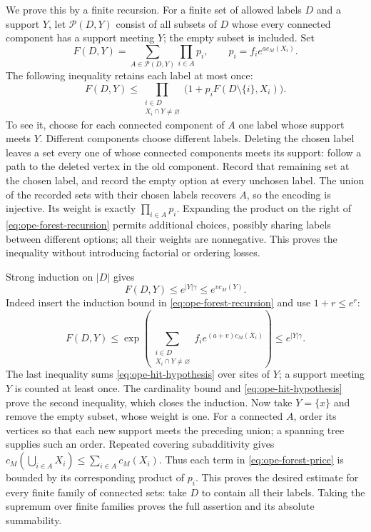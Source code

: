 We prove this by a finite recursion. For a finite set of allowed labels
$D$ and a support $Y$, let $\mathcal P(D,Y)$ consist of all subsets
of $D$ whose every connected component has a support meeting $Y$;
the empty subset is included. Set
\[
 F(D,Y)=\sum_{A\in\mathcal P(D,Y)}\prod_{i\in A}p_i,
 \qquad p_i=f_i e^{a c_M(X_i)}.
\]
The following inequality retains each label at most once:
\begin{equation}\label{eq:ope-forest-recursion}
 F(D,Y)\leq\prod_{\substack{i\in D\\X_i\cap Y\ne\varnothing}}
       \bigl(1+p_iF(D\setminus\{i\},X_i)\bigr).
\end{equation}
To see it, choose for each connected component of $A$ one label whose
support meets $Y$. Different components choose different labels.
Deleting the chosen label leaves a set every one of whose connected
components meets its support: follow a path to the deleted vertex
in the old component. Record that remaining set at the chosen label,
and record the empty option at every unchosen label. The union of the
recorded sets with their chosen labels recovers $A$, so the encoding
is injective. Its weight is exactly $\prod_{i\in A}p_i$. Expanding
the product on the right of \eqref{eq:ope-forest-recursion} permits
additional choices, possibly sharing labels between different options;
all their weights are nonnegative. This proves the inequality without
introducing factorial or ordering losses.

Strong induction on $|D|$ gives
\[
 F(D,Y)\leq e^{|Y|\gamma}\leq e^{v c_M(Y)}.
\]
Indeed insert the induction bound in
\eqref{eq:ope-forest-recursion} and use $1+r\leq e^r$:
\[
 F(D,Y)\leq
 \exp\!\left(\sum_{\substack{i\in D\\X_i\cap Y\ne\varnothing}}
           f_i e^{(a+v)c_M(X_i)}\right)
 \leq e^{|Y|\gamma}.
\]
The last inequality sums \eqref{eq:ope-hit-hypothesis} over sites
of $Y$; a support meeting $Y$ is counted at least once. The cardinality
bound and \eqref{eq:ope-hit-hypothesis} prove the second inequality,
which closes the induction. Now take $Y=\{x\}$ and remove the
empty subset, whose weight is one. For a connected $A$, order its
vertices so that each new support meets the preceding union; a
spanning tree supplies such an order. Repeated covering subadditivity
gives $c_M(\bigcup_{i\in A}X_i)\leq\sum_{i\in A}c_M(X_i)$.
Thus each term in \eqref{eq:ope-forest-price} is bounded by its
corresponding product of $p_i$. This proves the desired estimate
for every finite family of connected sets: take $D$ to contain all
their labels. Taking the supremum over finite families proves the
full assertion and its absolute summability.

